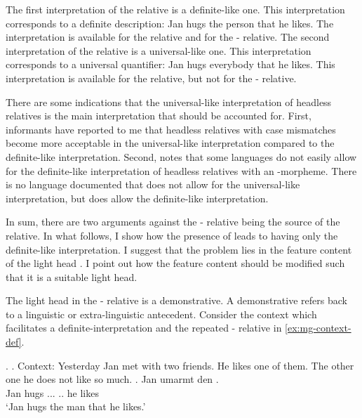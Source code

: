 The first interpretation of the  relative is a definite-like one. This interpretation corresponds to a definite description: Jan hugs the person that he likes. The interpretation is available for the  relative and for the - relative.
The second interpretation of the  relative is a universal-like one. This interpretation corresponds to a universal quantifier: Jan hugs everybody that he likes. This interpretation is available for the  relative, but not for the - relative.

There are some indications that the universal-like interpretation of headless relatives is the main interpretation that should be accounted for.
First, informants have reported to me that headless relatives with case mismatches become more acceptable in the universal-like interpretation compared to the definite-like interpretation.
Second,  notes that some languages do not easily allow for the definite-like interpretation of headless relatives with an -morpheme. There is no language documented that does not allow for the universal-like interpretation, but does allow the definite-like interpretation.

In sum, there are two arguments against the - relative being the source of the  relative. In what follows, I show how the presence of  leads to having only the definite-like interpretation. I suggest that the problem lies in the feature content of the light head . I point out how the feature content should be modified such that it is a suitable light head.

The light head in the - relative is a demonstrative. A demonstrative refers back to a linguistic or extra-linguistic antecedent. Consider the context which facilitates a definite-interpretation and the repeated - relative in \ref{ex:mg-context-def}.

\ex.
\a. Context: Yesterday Jan met with two friends. He likes one of them. The other one he does not like so much.\label{ex:mg-context-def}
\bg. Jan umarmt den   .\\
Jan hugs ... .. he likes\\
`Jan hugs the man that he likes.'


